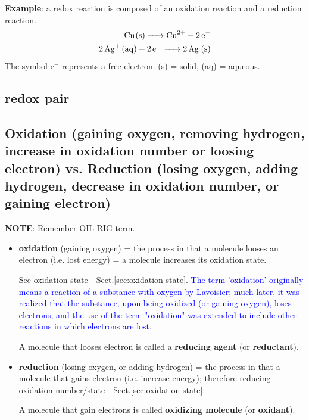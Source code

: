 {\bf Example}: a redox reaction is composed of an oxidation reaction and a
reduction reaction.
\begin{equation*}
\begin{split}
\ce{Cu(s) -> Cu^2+ + 2e-} \\
\ce{2Ag+ (aq) + 2e- -> 2Ag (s)}
\end{split}
\end{equation*}
The symbol e$^-$ represents a free electron. (s) = solid, (aq) = aqueous. 


\subsection{redox pair}
\label{sec:redox-pair}



\subsection{Oxidation (gaining oxygen, removing hydrogen, increase in oxidation
number or loosing electron) vs.
Reduction (losing oxygen, adding hydrogen, decrease in oxidation number, or
gaining electron)}
\label{sec:oxidation}
\label{sec:reduction}

{\bf NOTE}: Remember OIL RIG term.

\begin{itemize}
  \item  {\bf oxidation} (gaining oxygen) = the process in that a molecule
  looses an electron (i.e. lost energy) = a molecule increases its oxidation state.

  See oxidation state - Sect.\ref{sec:oxidation-state}. \textcolor{blue}{The
  term 'oxidation' originally means a reaction of a substance with oxygen
by Lavoisier; much later, it was realized that the substance, upon being
oxidized (or gaining oxygen), loses electrons, and the use of the term
"oxidation" was extended to include other reactions in which electrons are
lost.}

A molecule that looses electron is called a {\bf reducing agent} (or {\bf
reductant}).

  \item {\bf reduction} (losing oxygen, or adding hydrogen) = the process in
  that a molecule that gains electron (i.e. increase energy); therefore reducing
  oxidation number/state - Sect.\ref{sec:oxidation-state}.

A molecule that gain electrons is called {\bf oxidizing
molecule} (or {\bf oxidant}).
\end{itemize}


